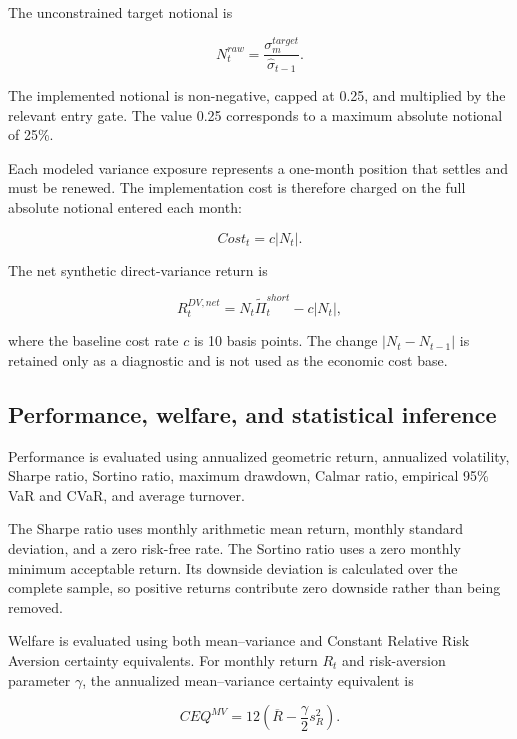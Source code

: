 The unconstrained target notional is

\begin{equation}
N_t^{raw}
=
\frac{
\sigma^{target}_{m}
}{
\widehat{\sigma}_{t-1}
}.
\end{equation}

The implemented notional is non-negative, capped at 0.25, and multiplied by the relevant entry gate. The value 0.25 corresponds to a maximum absolute notional of 25\%.

Each modeled variance exposure represents a one-month position that settles and must be renewed. The implementation cost is therefore charged on the full absolute notional entered each month:

\begin{equation}
Cost_t
=
c
\left|
N_t
\right|.
\end{equation}

The net synthetic direct-variance return is

\begin{equation}
R_t^{DV,net}
=
N_t
\widetilde{\Pi}_t^{short}
-
c
\left|
N_t
\right|,
\end{equation}

where the baseline cost rate $c$ is 10 basis points. The change $|N_t-N_{t-1}|$ is retained only as a diagnostic and is not used as the economic cost base.

\subsection{Performance, welfare, and statistical inference}

Performance is evaluated using annualized geometric return, annualized volatility, Sharpe ratio, Sortino ratio, maximum drawdown, Calmar ratio, empirical 95\% VaR and CVaR, and average turnover.

The Sharpe ratio uses monthly arithmetic mean return, monthly standard deviation, and a zero risk-free rate. The Sortino ratio uses a zero monthly minimum acceptable return. Its downside deviation is calculated over the complete sample, so positive returns contribute zero downside rather than being removed.

Welfare is evaluated using both mean--variance and Constant Relative Risk Aversion certainty equivalents. For monthly return $R_t$ and risk-aversion parameter $\gamma$, the annualized mean--variance certainty equivalent is

\begin{equation}
CEQ^{MV}
=
12
\left(
\overline{R}
-
\frac{\gamma}{2}
s_R^2
\right).
\end{equation}

